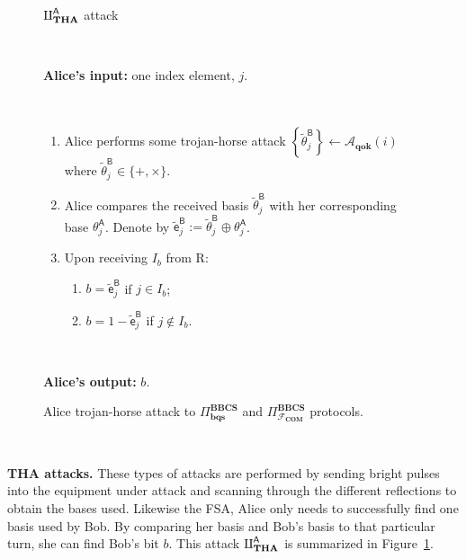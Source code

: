 \begin{figure}[h!]
    \centering
        \begin{tcolorbox}
            
            \centerline{$\rotPi^{\mathsf{A}}_{\textbf{THA}}$ attack}
            
            \
            
            \textbf{Alice's input:}  one index element, $j$.
            
            \
            
            \begin{enumerate}
         \item Alice performs some trojan-horse attack $\left\{\tilde{\theta}^{\mathsf{B}}_{j}\right\} \leftarrow \mathcal{A}_{\textbf{qok}}(i) $ where $\tilde{\theta}^{\mathsf{B}}_{j}\in\{+, \times\}$.
         \item Alice compares the received basis $\tilde{\theta}^{\mathsf{B}}_{j}$ with her corresponding base $\theta^{\mathsf{A}}_{j}$. Denote by $\tilde{\mathsf{e}}^{\mathsf{B}}_j := \tilde{\theta}^{\mathsf{B}}_{j} \oplus \theta^{\mathsf{A}}_{j}$. 
         \item Upon receiving $I_b$ from R:
         \begin{enumerate}
             \item $b=\tilde{\mathsf{e}}^{\mathsf{B}}_j$ if $j\in I_b$;
             \item $b=1-\tilde{\mathsf{e}}^{\mathsf{B}}_j$ if $j\notin I_b$.
         \end{enumerate}
         
    \end{enumerate}    
            
            \
            
        \textbf{Alice's output:} $b$.

        
        \end{tcolorbox}
    \caption{Alice trojan-horse attack to $\Pi^{\textbf{BBCS}}_{\textbf{bqs}}$ and $\Pi^{\textbf{BBCS}}_{\mathcal{F}_\textbf{COM}}$ protocols.}
    \label{fig:A_THA}
\end{figure}

\

\noindent\textbf{THA attacks.} These types of attacks are performed by sending bright pulses into the equipment under attack and scanning through the different reflections to obtain the bases used. Likewise the FSA, Alice only needs to successfully find one basis used by Bob. By comparing her basis and Bob's basis to that particular turn, she can find Bob's bit $b$. This attack $\rotPi^{\mathsf{A}}_{\textbf{THA}}$ is summarized in Figure~\ref{fig:A_THA}. 

